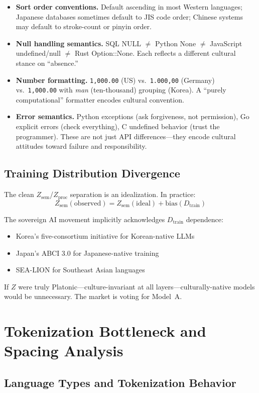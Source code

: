 \documentclass{article}
\theoremstyle{definition}
\newcommand{\Zsem}{Z_{\text{sem}}}
\newcommand{\Zproc}{Z_{\text{proc}}}
\newcommand{\Dtrain}{D_{\text{train}}}
\begin{document}
\begin{itemize}[nosep]
  \item \textbf{Sort order conventions.} Default ascending in most Western languages; Japanese databases sometimes default to JIS code order; Chinese systems may default to stroke-count or pinyin order.
  \item \textbf{Null handling semantics.} SQL NULL $\neq$ Python None $\neq$ JavaScript undefined/null $\neq$ Rust Option::None. Each reflects a different cultural stance on ``absence.''
  \item \textbf{Number formatting.} \texttt{1,000.00} (US) vs.\ \texttt{1.000,00} (Germany) vs.\ \texttt{1,000.00} with \emph{man} (ten-thousand) grouping (Korea). A ``purely computational'' formatter encodes cultural convention.
  \item \textbf{Error semantics.} Python exceptions (ask forgiveness, not permission), Go explicit errors (check everything), C undefined behavior (trust the programmer). These are not just API differences---they encode cultural attitudes toward failure and responsibility.
\end{itemize}

\subsection{Training Distribution Divergence}

The clean $\Zsem$/$\Zproc$ separation is an idealization. In practice:
\[
\Zsem(\text{observed}) = \Zsem(\text{ideal}) + \mathrm{bias}(\Dtrain)
\]

The sovereign AI movement implicitly acknowledges $\Dtrain$ dependence:
\begin{itemize}[nosep]
  \item Korea's five-consortium initiative for Korean-native LLMs
  \item Japan's ABCI 3.0 for Japanese-native training
  \item SEA-LION for Southeast Asian languages
\end{itemize}
If $Z$ were truly Platonic---culture-invariant at all layers---culturally-native models would be unnecessary. The market is voting for Model~A.

\section{Tokenization Bottleneck and Spacing Analysis}\label{app:tokenization}

\subsection{Language Types and Tokenization Behavior}
\end{document}
